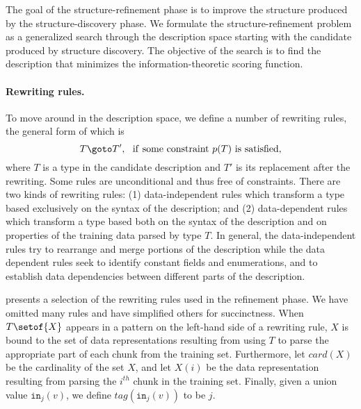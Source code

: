 The goal of the structure-refinement phase is to improve
the structure produced by the structure-discovery phase. We
formulate the structure-refinement problem as a generalized search
through the description space starting with the candidate produced by
structure discovery. The
objective of the search is to find the description that minimizes
the information-theoretic scoring function.

\paragraph*{Rewriting rules.}
To move around in the description space, we define a number of 
rewriting rules, the general form of which is
\[T \goto T', ~~ {\rm if~ some~ constraint~} p(T)~ {\rm is~ satisfied,}\]
where $T$ is a type in the candidate description and $T'$ is its
replacement after the
rewriting.  Some rules are unconditional and thus free of constraints.
There are two kinds of rewriting rules: (1) data-independent rules which
transform a type based exclusively on the syntax of the description; 
and (2) data-dependent
rules which transform a type based both on the syntax of the description
and on properties of the training data parsed by type $T$.  In general, 
the data-independent rules try to rearrange and merge portions
of the description while the data dependent rules seek to identify 
constant fields and enumerations, and to establish data dependencies
between different parts of the description.

 presents a selection of the rewriting rules used in
the refinement phase. We have omitted many rules and have simplified
others for succinctness.
When $T\setof{X}$ appears in a pattern on the left-hand side of a rewriting
rule, $X$ is bound to the set of data representations resulting
from using $T$ to parse the appropriate part of each chunk from the training
set. Furthermore, let $card(X)$ be the cardinality of the set $X$, 
and let $X(i)$ be the data representation resulting
from parsing the $i^{th}$ chunk in the training set. Finally, given a union
value $\mathtt{in}_j(v)$, we define $tag(\mathtt{in}_j(v))$ to be $j$.

